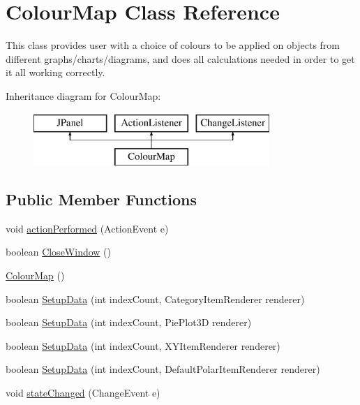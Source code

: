 \hypertarget{class_colour_map}{\section{Colour\-Map Class Reference}
\label{class_colour_map}
}


This class provides user with a choice of colours to be applied on objects from different graphs/charts/diagrams, and does all calculations needed in order to get it all working correctly.  


Inheritance diagram for Colour\-Map\-:\begin{figure}[H]
\begin{center}
\leavevmode
\includegraphics[height=2.000000cm]{class_colour_map}
\end{center}
\end{figure}
\subsection*{Public Member Functions}
\begin{DoxyCompactItemize}
\item 
void \hyperlink{class_colour_map_a1d41944f53775bc1a8f633063a69aca5}{action\-Performed} (Action\-Event e)
\item 
boolean \hyperlink{class_colour_map_a397ebd08df86cb0bcbc71d3e4e1ebee4}{Close\-Window} ()
\item 
\hyperlink{class_colour_map_abba281e323f79dc7dc5f31efe4b67852}{Colour\-Map} ()
\item 
boolean \hyperlink{class_colour_map_a9f696ea699b7fc471bb2dde6f1d1ce09}{Setup\-Data} (int index\-Count, Category\-Item\-Renderer renderer)
\item 
boolean \hyperlink{class_colour_map_a08978bcdc84ed70cf1139b166e37d25f}{Setup\-Data} (int index\-Count, Pie\-Plot3\-D renderer)
\item 
boolean \hyperlink{class_colour_map_a57b6f3c3f3beff5075bd82e621591138}{Setup\-Data} (int index\-Count, X\-Y\-Item\-Renderer renderer)
\item 
boolean \hyperlink{class_colour_map_a952af2354acfb507997b8fc3c38de5f7}{Setup\-Data} (int index\-Count, Default\-Polar\-Item\-Renderer renderer)
\item 
void \hyperlink{class_colour_map_a178d4ed4be0c7d2b03d2e990c9b359b0}{state\-Changed} (Change\-Event e)
\end{DoxyCompactItemize}

